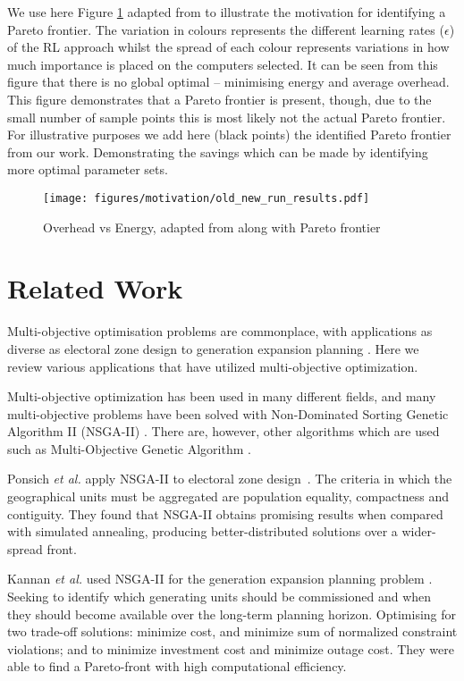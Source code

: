 \documentclass[10pt, conference, compsocconf]{IEEEtran}
\begin{document}
We use here Figure \ref{ohven} adapted from \cite{suscom} to illustrate the motivation for identifying a Pareto frontier. The variation in colours represents the different learning rates ($\epsilon$) of the RL approach whilst the spread of each colour represents variations in how much importance is placed on the computers selected. It can be seen from this figure that there is no global optimal -- minimising energy and average overhead. This figure demonstrates that a Pareto frontier is present, though, due to the small number of sample points this is most likely not the actual Pareto frontier. For illustrative purposes we add here (black points) the identified Pareto frontier from our work. Demonstrating the savings which can be made by identifying more optimal parameter sets.
\begin{figure}[t]
\centering
\texttt{[image: figures/motivation/old\_new\_run\_results.pdf]}
\vskip -10pt
\caption{Overhead vs Energy, adapted from \cite{suscom} along with Pareto frontier}
\label{ohven}
\vskip -15pt
\end{figure}
\section{Related Work}
\label{relatedWork}
Multi-objective optimisation problems are commonplace, with applications as diverse as electoral zone design \cite{Ponsich2017} to generation expansion planning \cite{Kannan2009}. Here we review various applications that have utilized multi-objective optimization.

Multi-objective optimization has been used in many different fields, and many multi-objective problems have been solved with Non-Dominated Sorting Genetic Algorithm II (NSGA-II) \cite{Valkanas2014}. There are, however, other algorithms which are used such as Multi-Objective Genetic Algorithm \cite{T.MurataandH.Ishibuchi1995}.

Ponsich \textit{et al.} apply NSGA-II to electoral zone design~\cite{Ponsich2017}. The criteria in which the geographical units must be aggregated are population equality, compactness and contiguity. They found that NSGA-II obtains promising results when compared with simulated annealing, producing better-distributed solutions over a wider-spread front.

Kannan \textit{et al.} used NSGA-II for the generation expansion planning problem  \cite{Kannan2009}. Seeking to identify which generating units should be commissioned and when they should become available over the long-term planning horizon. Optimising for two trade-off solutions: minimize cost, and minimize sum of normalized constraint violations; and to minimize investment cost and minimize outage cost. They were able to find a Pareto-front with high computational efficiency.
\end{document}
